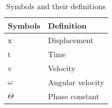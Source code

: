 \begin{table}[htbp]
    \centering
    \def\arraystretch{1.5}
    \begin{tabular}{|p{2cm}|p{2cm}|}
    \hline
    Symbols&Definition \\  \hline
    x&Displacement \\  \hline
    t&Time \\ \hline
    v&Velocity \\ \hline
    $\omega$&Angular velocity \\  \hline
    $\Theta$&Phase constant \\  \hline
    \end{tabular}
    \caption{Symbols and their definitions}
    \label{tab:Table1}
\end{table}
